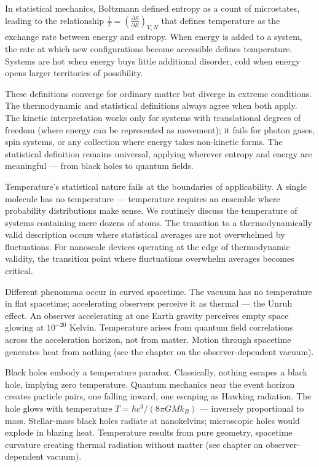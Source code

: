 In statistical mechanics, Boltzmann defined entropy as a count of microstates, leading to the relationship $ \frac{1}{T} = \left( \frac{\partial S}{\partial E} \right)_{V,N} $ that defines temperature as the exchange rate between energy and entropy. When energy is added to a system, the rate at which new configurations become accessible defines temperature. Systems are hot when energy buys little additional disorder, cold when energy opens larger territories of possibility.

These definitions converge for ordinary matter but diverge in extreme conditions. The thermodynamic and statistical definitions always agree when both apply. The kinetic interpretation works only for systems with translational degrees of freedom (where energy can be represented as movement); it fails for photon gases, spin systems, or any collection where energy takes non-kinetic forms. The statistical definition remains universal, applying wherever entropy and energy are meaningful — from black holes to quantum fields.

Temperature's statistical nature fails at the boundaries of applicability. A single molecule has no temperature — temperature requires an ensemble where probability distributions make sense. We routinely discuss the temperature of systems containing mere dozens of atoms. The transition to a thermodynamically valid description occurs where statistical averages are not overwhelmed by fluctuations. For nanoscale devices operating at the edge of thermodynamic validity, the transition point where fluctuations overwhelm averages becomes critical.

Different phenomena occur in curved spacetime. The vacuum has no temperature in flat spacetime; accelerating observers perceive it as thermal — the Unruh effect. An observer accelerating at one Earth gravity perceives empty space glowing at $10^{-20}$ Kelvin. Temperature arises from quantum field correlations across the acceleration horizon, not from matter. Motion through spacetime generates heat from nothing (see the chapter on the observer-dependent vacuum).

Black holes embody a temperature paradox. Classically, nothing escapes a black hole, implying zero temperature. Quantum mechanics near the event horizon creates particle pairs, one falling inward, one escaping as Hawking radiation. The hole glows with temperature $T = \hbar c^3 / (8\pi G M k_B)$ — inversely proportional to mass. Stellar-mass black holes radiate at nanokelvins; microscopic holes would explode in blazing heat. Temperature results from pure geometry, spacetime curvature creating thermal radiation without matter (see chapter on observer-dependent vacuum).

